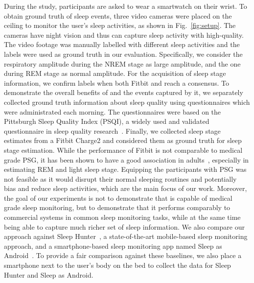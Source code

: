During the study, participants are asked to wear a smartwatch on their wrist. To obtain ground truth of sleep events, three video cameras were placed on the ceiling to monitor the user's sleep activities, as shown in Fig.~\ref{fig:setup}. The cameras have night vision and thus can capture sleep activity with high-quality. The video footage was manually labelled with different sleep activities and the labels were used as ground truth in our evaluation. Specifically, we consider the respiratory amplitude during the NREM stage as large amplitude, and the one during REM stage as normal amplitude.  For the acquisition of sleep stage information, we confirm labels when both Fitbit and \systemname reach a consensus. To demonstrate the overall benefits of \systemname and the events captured by it, we separately collected ground truth information about sleep quality using questionnaires which were administrated each morning. The questionnaires were based on the Pittsburgh Sleep Quality Index (PSQI), a widely used and validated questionnaire in sleep quality research~\cite{buysse1989pittsburgh}. Finally, we collected sleep stage estimates from a Fitbit Charge2 and considered them as ground truth for sleep stage estimation. While the performance of Fitbit is not comparable to medical grade PSG, it has been shown to have a good association in adults~\cite{evenson2015systematic,fitbit01,fitbit02,fitbit03}, especially in estimating REM and light sleep stage. Equipping the participants with PSG was not feasible as it would disrupt their normal sleeping routines and potentially bias and reduce sleep activities, which are the main focus of our work. Moreover, the goal of our experiments is not to demonstrate that \systemname is capable of medical grade sleep monitoring, but to demonstrate that it performs comparably to commercial systems in common sleep monitoring tasks, while at the same time being able to capture much richer set of sleep information.  We also compare our approach against Sleep Hunter~\cite{gu2016sleep}, a state-of-the-art mobile-based sleep monitoring approach, and a
smartphone-based sleep monitoring app named Sleep as Android~\cite{SleepAndroid}. To provide a fair comparison against these baselines, we also place a smartphone next to the user's body on the bed to collect the data for Sleep Hunter and Sleep as Android.
	
